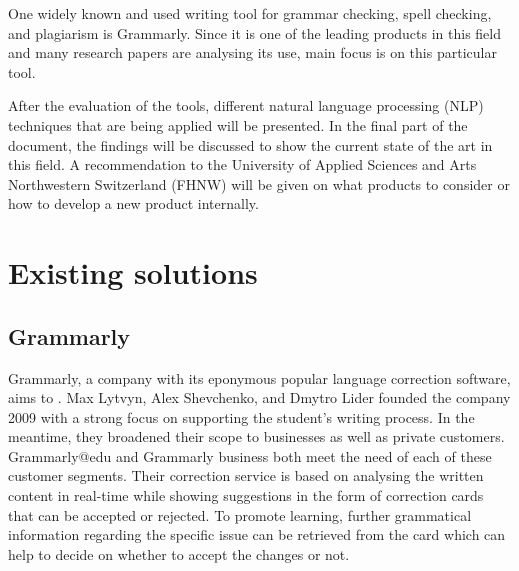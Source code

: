 \documentclass[runningheads]{llncs}
\let\OldTextregistered\textregistered
\renewcommand{\textregistered}{\OldTextregistered\xspace}
\begin{document}
One widely known and used writing tool for grammar checking, spell checking, and plagiarism is Grammarly\textregistered. Since it is one of the leading products in this field and many research papers are analysing its use, main focus is on this particular tool.

After the evaluation of the tools, different natural language processing (NLP) techniques that are being applied will be presented. In the final part of the document, the findings will be discussed to show the current state of the art in this field. A recommendation to the University of Applied Sciences and Arts Northwestern Switzerland (FHNW) will be given on what products to consider or how to develop a new product internally.


\section{Existing solutions}
\subsection{Grammarly\textregistered}
Grammarly\textregistered, a company with its eponymous popular language correction software, aims to . Max Lytvyn, Alex Shevchenko, and Dmytro Lider founded the company 2009 with a strong focus on supporting the student's writing process. In the meantime, they broadened their scope to businesses as well as private customers. Grammarly\textregistered @edu and Grammarly\textregistered business both meet the need of each of these customer segments. Their correction service is based on analysing the written content in real-time while showing suggestions in the form of correction cards that can be accepted or rejected. To promote learning, further grammatical information regarding the specific issue can be retrieved from the card which can help to decide on whether to accept the changes or not. \citep{noauthor_grammarly_nodate}
\end{document}
